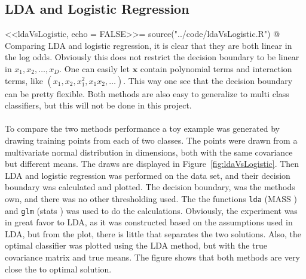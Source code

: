 \subsection{LDA and Logistic Regression}
\label{sub:LDA and Logistic Regre}
<<ldaVsLogistic, echo = FALSE>>=
source("../code/ldaVsLogistic.R")
@
Comparing LDA and logistic regression, it is clear that they are both linear in the log odds. Obviously this does not restrict the decision boundary to be linear in $x_1, x_2, \ldots , x_D$. One can easily let $\mathbf{x}$ contain polynomial terms and interaction terms, like $(x_1, x_2, x_1^2, x_1 x_2, \ldots )$. This way one see that the decision boundary can be pretty flexible. Both methods are also easy to generalize to multi class classifiers, but this will not be done in this project. \\
\\
To compare the two methods performance a toy example was generated by drawing  training points from each of two classes. The points were drawn from a multivariate normal distribution in  dimensions, both with the same covariance but different means. The draws are displayed in Figure~\ref{fig:ldaVsLogistic}. Then LDA and logistic regression was performed on the data set, and their decision boundary was calculated and plotted. The decision boundary, was the methods own, and there was no other thresholding used. The the functions \verb+lda+ (MASS \cite{mass}) and \verb+glm+ (stats \cite{stats}) was used to do the calculations. Obviously, the experiment was in great favor to LDA, as it was constructed based on the assumptions used in LDA, but from the plot, there is little that separates the two solutions. Also, the optimal classifier was plotted using the LDA method, but with the true covariance matrix and true means. The figure shows that both methods are very close the to optimal solution.

